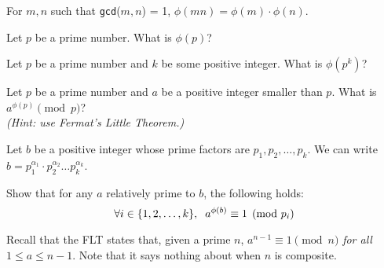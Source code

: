   For $m,n$ such that \texttt{gcd}($m,n$) = 1, $\phi(mn) = \phi(m) \cdot \phi(n)$.

  \begin{Parts}
  \Part
    Let $p$ be a prime number.
    What is $\phi(p)$?

    \Part
    Let $p$ be a prime number and $k$ be some positive integer.
    What is $\phi(p^k)$?


    \Part
    Let $p$ be a prime number and $a$ be a positive integer smaller than $p$.
    What is $a^{\phi(p)} \pmod{p}$?\\\emph{(Hint: use Fermat's Little Theorem.)}

    \Part
    Let $b$ be a positive integer whose prime factors are $p_1,p_2,\hdots, p_k$.
    We can write $b = p_1^{\alpha_1}\cdot p_2^{\alpha_2} \hdots p_k^{\alpha_k}$.

    Show that for any $a$ relatively prime to $b$, the following holds:
    $$\forall i \in \{1,2,\hdots,k\}, \hspace{0.2cm} a^{\phi(b)} \equiv 1 \pmod{p_i}$$

  \end{Parts}



Recall that the FLT states that, given a prime $n$, $a^{n-1} \equiv 1 \pmod{n}$ \textit{for all $1 \leq a \leq n-1$}. Note that it says nothing about when $n$ is composite.

